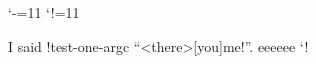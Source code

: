 \documentclass{article}
\gdef\sdi!test-one-arg{\sdiXtestHoneHarg}
\gdef\hyphen-ok-here{\hyphenHokHhere}
\def\sdi!later{\sdiXlater}
\begin{document}
\catcode`-=11
\catcode`!=11
\renewcommand{\-}{\hyphen-ok-here}

I said \sdi!test-one-arg{c} ``\sdi!later<there>[you]{me}!''. 
eee\-{}eee  \the\catcode`!
\end{document}
